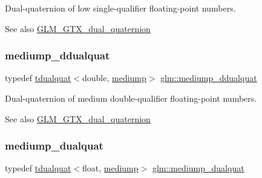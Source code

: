 Dual-\/quaternion of low single-\/qualifier floating-\/point numbers.

\begin{DoxySeeAlso}{See also}
\mbox{\hyperlink{group__gtx__dual__quaternion}{G\+L\+M\+\_\+\+G\+T\+X\+\_\+dual\+\_\+quaternion}} 
\end{DoxySeeAlso}
\mbox{\label{group__gtx__dual__quaternion_ga5727116ab20b2a1d40387766d723dd6c}} 
\subsubsection{\texorpdfstring{mediump\+\_\+ddualquat}{mediump\_ddualquat}}
{\footnotesize\ttfamily typedef \mbox{\hyperlink{structglm_1_1tdualquat}{tdualquat}}$<$double, \mbox{\hyperlink{namespaceglm_a36ed105b07c7746804d7fdc7cc90ff25a6416f3ea0c9025fb21ed50c4d6620482}{mediump}}$>$ \mbox{\hyperlink{group__gtx__dual__quaternion_ga5727116ab20b2a1d40387766d723dd6c}{glm\+::mediump\+\_\+ddualquat}}}

Dual-\/quaternion of medium double-\/qualifier floating-\/point numbers.

\begin{DoxySeeAlso}{See also}
\mbox{\hyperlink{group__gtx__dual__quaternion}{G\+L\+M\+\_\+\+G\+T\+X\+\_\+dual\+\_\+quaternion}} 
\end{DoxySeeAlso}
\mbox{\label{group__gtx__dual__quaternion_gaa88fe93eb823d1aba8d6df8028572cb5}} 
\subsubsection{\texorpdfstring{mediump\+\_\+dualquat}{mediump\_dualquat}}
{\footnotesize\ttfamily typedef \mbox{\hyperlink{structglm_1_1tdualquat}{tdualquat}}$<$float, \mbox{\hyperlink{namespaceglm_a36ed105b07c7746804d7fdc7cc90ff25a6416f3ea0c9025fb21ed50c4d6620482}{mediump}}$>$ \mbox{\hyperlink{group__gtx__dual__quaternion_gaa88fe93eb823d1aba8d6df8028572cb5}{glm\+::mediump\+\_\+dualquat}}}

